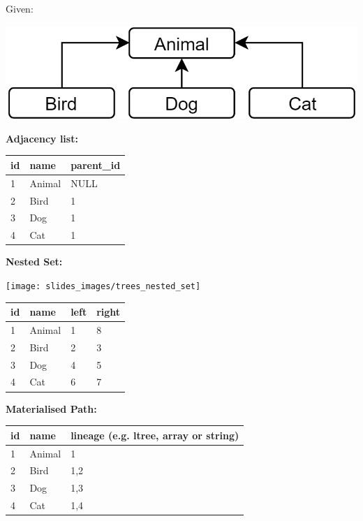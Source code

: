\begin{breakbox}

Given:
\begin{center}
	\includegraphics[width=.10\textwidth]{slides_images/tree_given_example}
\end{center}

\textbf{Adjacency list:}

\begin{tabular}{lll}
id & name   & parent\_id \\
\hline
1  & Animal & NULL       \\
2  & Bird   & 1          \\
3  & Dog    & 1          \\
4  & Cat    & 1         
\end{tabular}

\textbf{Nested Set:}
\begin{center}
	\texttt{[image: slides\_images/trees\_nested\_set]}
\end{center}

\begin{tabular}{llll}
id & name   & left & right \\
\hline
1  & Animal & 1    & 8     \\
2  & Bird   & 2    & 3     \\
3  & Dog    & 4    & 5     \\
4  & Cat    & 6    & 7    
\end{tabular}

\textbf{Materialised Path:}

\begin{tabular}{lll}
id & name   & lineage (e.g. ltree, array or string) \\
\hline
1  & Animal & 1                    \\
2  & Bird   & 1,2                  \\
3  & Dog    & 1,3                  \\
4  & Cat    & 1,4                 
\end{tabular}
\end{breakbox}